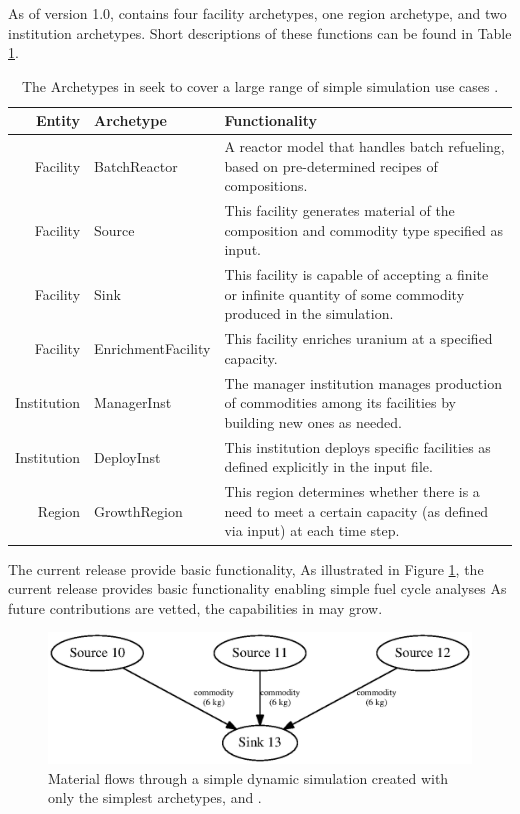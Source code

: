 As of version 1.0, \Cycamore contains four facility archetypes, one region
archetype, and two institution archetypes. Short descriptions of these
functions can be found in Table \ref{tab:cycamore}.


\begin{table}[h]
\centering
\begin{tabularx}{\textwidth}{|r|l|X|}
\hline
\textbf{Entity} & \textbf{Archetype} & \textbf{Functionality} \\
\hline
Facility & BatchReactor & A reactor model that handles batch refueling, based on pre-determined recipes of compositions. \\
Facility & Source & This facility generates material of the composition and commodity type specified as input.  \\
Facility & Sink & This facility is capable of accepting a finite or infinite quantity of some commodity produced in the simulation. \\
Facility & EnrichmentFacility & This facility enriches uranium at a specified capacity. \\
Institution & ManagerInst & The manager institution manages production of commodities among its facilities by building new ones as needed. \\
Institution & DeployInst &  This institution deploys specific facilities as defined explicitly in the input file. \\
Region & GrowthRegion & This region determines whether there is a need to meet a certain capacity (as defined via input) at each time step. \\
\hline
\end{tabularx}
\caption{The Archetypes in \Cycamore seek to cover a large range of simple simulation use cases \cite{carlsen_cycamore_2014}.}
\label{tab:cycamore}
\end{table}

The current \Cycamore release provide basic functionality, As illustrated in
Figure \ref{fig:simplesim}, the current \Cycamore release provides basic
functionality enabling simple fuel cycle analyses  As future contributions are
vetted, the capabilities in \Cycamore may grow.

\begin{figure}[htbp!]
\begin{center}
\includegraphics{./images/simplesim}
\end{center}
\caption{Material flows through a simple dynamic simulation created with only the simplest \Cycamore archetypes,  and .}
\label{fig:simplesim}
\end{figure}

